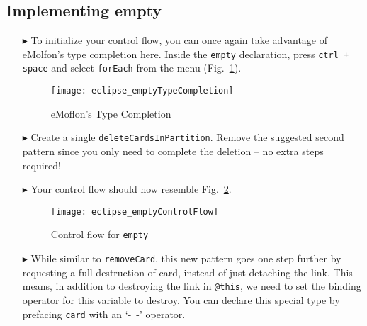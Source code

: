 \newpage
\hypertarget{emptyPartition tex}{}
\subsection{Implementing empty}
\texHeader

\begin{itemize}
 
\item[$\blacktriangleright$] To initialize your control flow, you can once again take advantage of eMolfon's type completion here. Inside the \texttt{empty}
declaration, press  \texttt{ctrl + space} and select \texttt{forEach} from the menu (Fig.~\ref{fig:typeCompletion}).

\vspace{1cm}

\begin{figure}[htpb]
\begin{center}
  \texttt{[image: eclipse\_emptyTypeCompletion]}
  \caption{eMoflon's Type Completion}
  \label{fig:typeCompletion}
\end{center}
\end{figure}

\vspace{1cm}

\item[$\blacktriangleright$] Create a single \texttt{deleteCardsInPartition}. Remove the suggested second pattern since you only need to complete the deletion
-- no extra steps required!

\item[$\blacktriangleright$] Your control flow should now resemble Fig.~\ref{fig:emptyControlFlow}.

\clearpage

\begin{figure}[htpb]
\begin{center}
  \texttt{[image: eclipse\_emptyControlFlow]}
  \caption{Control flow for \texttt{empty}}
  \label{fig:emptyControlFlow}
\end{center}
\end{figure}

\item[$\blacktriangleright$] While similar to \texttt{removeCard}, this new pattern goes one step further by requesting a full destruction of card, instead of
just detaching the link. This means, in addition to destroying the link in \texttt{@this}, we need to set the binding operator for this variable to destroy. 
You can declare this special type by prefacing \texttt{card} with an `-~-' operator.


\end{itemize}

